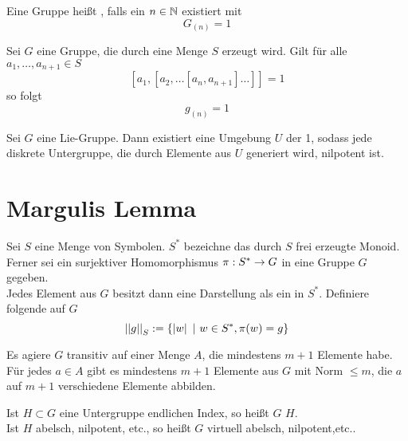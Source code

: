 \documentclass{book}
\begin{document}
\Def{}
Eine Gruppe heißt , falls ein $n \in \mathbb{N}$ existiert mit
\[ G_{(n)} = 1 \]

\Prop{}
Sei $G$ eine Gruppe, die durch eine Menge $S$ erzeugt wird. Gilt für alle $a_1,\ldots, a_{n+1} \in S$
\[ [a_1, [a_2,  \ldots [a_n, a_{n+1} ] \ldots ]] = 1 \]
so folgt
\[ g_{(n)} = 1 \]

\Lem{}
Sei $G$ eine Lie-Gruppe. Dann existiert eine Umgebung $U$ der 1, sodass jede diskrete Untergruppe, die durch Elemente aus $U$ generiert wird, nilpotent ist.

\section{Margulis Lemma}

\Def{}
Sei $S$ eine Menge von Symbolen. $S^*$ bezeichne das durch $S$ frei erzeugte Monoid. Ferner sei ein surjektiver Homomorphismus $\pi : S^* \overset{}{\rightarrow} G$ in eine Gruppe $G$ gegeben.\\
Jedes Element aus $G$ besitzt dann eine Darstellung als ein  in $S^*$. Definiere folgende  auf $G$
\[ \norm{g}_S := \set{\bet{w}}{w\in S^*, \pi(w) = g} \]

\Lem{}
Es agiere $G$ transitiv auf einer Menge $A$, die mindestens $m+1$ Elemente habe. Für jedes $a \in A$ gibt es mindestens $m+1$ Elemente aus $G$ mit Norm $\leq m$, die $a$ auf $m+1$ verschiedene Elemente abbilden.

\Def{}
Ist $H \subset G$ eine Untergruppe endlichen Index, so heißt $G$  $H$.\\
Ist $H$ abelsch, nilpotent, etc., so heißt $G$ virtuell abelsch, nilpotent,etc..
\end{document}
